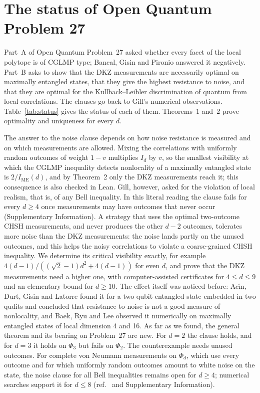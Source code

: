 \documentclass[11pt]{article}
\newcommand{\IME}{I_{\mathrm{ME}}}
\begin{document}
\section*{The status of Open Quantum Problem 27}

Part~A of Open Quantum Problem~27 asked whether every facet of the local polytope is of CGLMP type; Bancal, Gisin and
Pironio answered it negatively\cite{BGP2010}. Part~B asks to show that the DKZ measurements are necessarily optimal on
maximally entangled states, that they give the highest resistance to noise, and that they are optimal for the
Kullback--Leibler discrimination of quantum from local correlations\cite{OQP27}. The clauses go back to Gill's numerical
observations\cite{Gill2007}. Table~\ref{tab:status} gives the status of each of them. Theorems~1 and~2 prove
optimality and uniqueness for every $d$.

The answer to the noise clause depends on how noise resistance is measured and on which measurements are allowed. Mixing the correlations with uniformly
random outcomes of weight $1-v$ multiplies $I_d$ by $v$, so the smallest visibility at which the CGLMP inequality
detects nonlocality of a maximally entangled state is $2/\IME(d)$, and by Theorem~2 only the DKZ measurements reach it;
this consequence is also checked in Lean. Gill, however, asked for the violation of local realism, that is, of any Bell
inequality\cite{Gill2007}. In this literal reading the clause fails for every $d\ge4$ once measurements may have
outcomes that never occur (Supplementary Information). A strategy that uses the optimal two-outcome CHSH measurements,
and never produces the other $d-2$ outcomes, tolerates more noise than the DKZ measurements: the noise lands partly on the unused outcomes, and this helps the noisy
correlations to violate a coarse-grained CHSH inequality. We determine its critical visibility exactly, for
example $4(d-1)/((\sqrt2-1)d^2+4(d-1))$ for even $d$, and prove that the DKZ measurements need a higher one, with
computer-assisted certificates for $4\le d\le9$ and an elementary bound for $d\ge10$. The effect itself was noticed
before: Ac\'{\i}n, Durt, Gisin and Latorre found it for a two-qubit entangled state embedded in two qudits and concluded
that resistance to noise is not a good measure of nonlocality\cite{ADGL2002}, and Baek, Ryu and Lee observed it
numerically on maximally entangled states of local dimension 4 and 16\cite{BaekRyuLee2025}. As far as we found, the
general theorem and its bearing on Problem~27 are new. For $d=2$ the clause holds, and for $d=3$ it holds on $\Phi_3$
but fails on $\Phi_2$. The counterexample needs unused outcomes. For complete von Neumann measurements on $\Phi_d$, which
use every outcome and for which uniformly random outcomes amount to white noise on the state, the noise clause for all
Bell inequalities remains open for $d\ge4$; numerical searches support it for $d\le8$ (ref.~ and
Supplementary Information).
\end{document}
